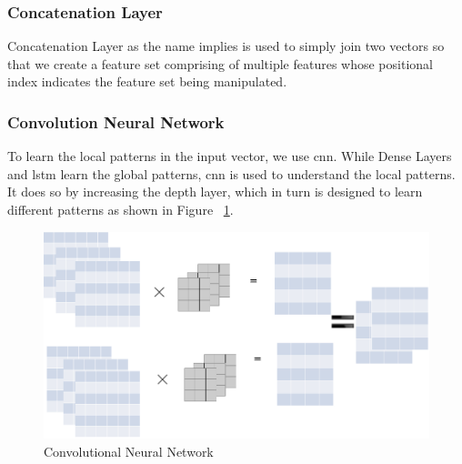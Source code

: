 \subsubsection{Concatenation Layer}
Concatenation Layer as the name implies is used to simply join two vectors so that we create a feature set comprising of multiple features whose positional index indicates the feature set being manipulated.

\subsubsection{Convolution Neural Network}
To learn the local patterns in the input vector, we use \acrshort{cnn}. While Dense Layers and \acrshort{lstm} learn the global patterns, \acrshort{cnn} is used to understand the local patterns. It does so by increasing the depth layer, which in turn is designed to learn different patterns as shown in Figure ~\ref{fig:cnn}.
\begin{figure}[ht]
  \centering
  \includegraphics[width=.5\linewidth]{mainmatter/3-Methodology/images/cnn.png}
  \caption{Convolutional Neural Network}
  \label{fig:cnn}
\end{figure}

